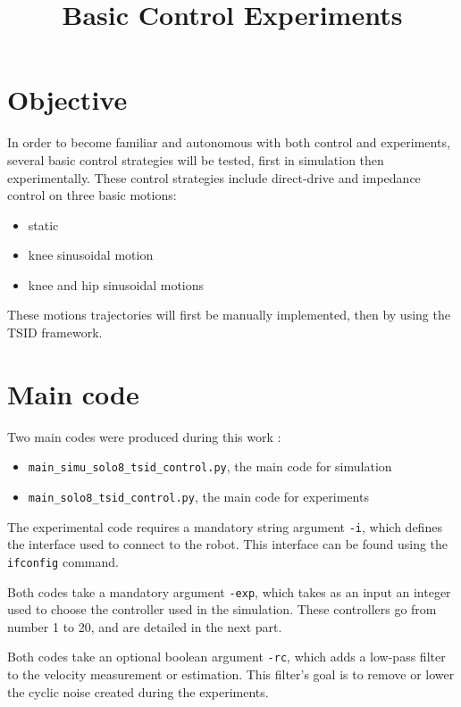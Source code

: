 \documentclass[12pt,a4paper]{article}
\title{Basic Control Experiments}
\date{}
\begin{document}
\maketitle

\section{Objective}

In order to become familiar and autonomous with both control and experiments, several basic control strategies will be tested, first in simulation then experimentally. These control strategies include direct-drive and impedance control on three basic motions: 
\begin{itemize}
    \item static
    \item knee sinusoidal motion
    \item knee and hip sinusoidal motions
\end{itemize}

These motions trajectories will first be manually implemented, then by using the TSID framework. 

\section{Main code}

Two main codes were produced during this work : 
\begin{itemize}
    \item \texttt{main\_simu\_solo8\_tsid\_control.py}, the main code for simulation
    \item \texttt{main\_solo8\_tsid\_control.py}, the main code for experiments
\end{itemize}

The experimental code requires a mandatory string argument \texttt{-i}, which defines the interface used to connect to the robot. This interface can be found using the \texttt{ifconfig} command. 

Both codes take a mandatory argument \texttt{-exp}, which takes as an input an integer used to choose the controller used in the simulation. These controllers go from number 1 to 20, and are detailed in the next part.

Both codes take an optional boolean argument \texttt{-rc}, which adds a low-pass filter to the velocity measurement or estimation. This filter's goal is to remove or lower the cyclic noise created during the experiments. 
\end{document}
